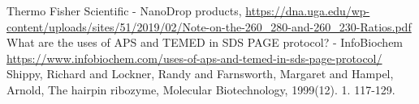 \documentclass{ltjsarticle}
\theoremstyle{definition}
\numberwithin{equation}{section}
\begin{document}





\begin{thebibliography}{99}
Thermo Fisher Scientific - NanoDrop products, 
\url{https://dna.uga.edu/wp-content/uploads/sites/51/2019/02/Note-on-the-260_280-and-260_230-Ratios.pdf}
What are the uses of APS and TEMED in SDS PAGE protocol? - InfoBiochem
\url{https://www.infobiochem.com/uses-of-aps-and-temed-in-sds-page-protocol/}
Shippy, Richard and Lockner, Randy and Farnsworth, Margaret and Hampel, Arnold, The hairpin ribozyme, Molecular Biotechnology, 1999(12). 1. 117-129.


\end{thebibliography}
\end{document}
